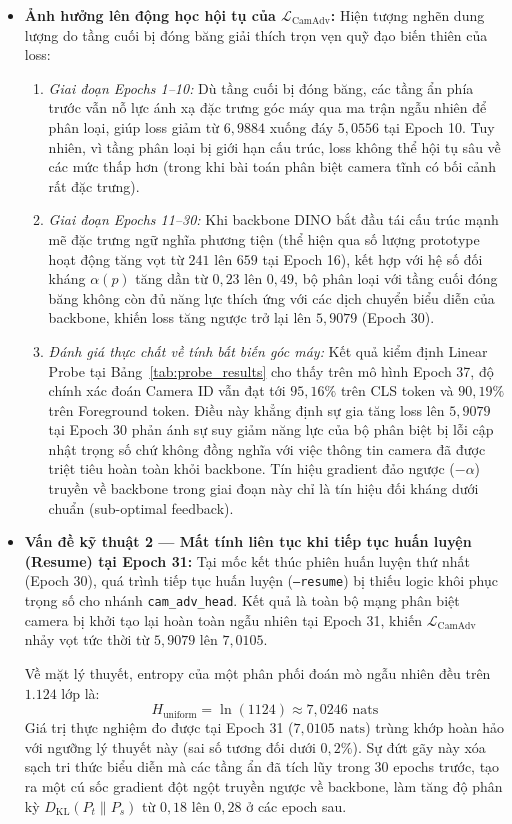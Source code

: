 \documentclass[11pt,a4paper]{article}
\begin{document}
\begin{itemize}
    \item \textbf{Ảnh hưởng lên động học hội tụ của $\mathcal{L}_{\text{CamAdv}}$:}
    Hiện tượng nghẽn dung lượng do tầng cuối bị đóng băng giải thích trọn vẹn quỹ đạo biến thiên của loss:
    \begin{enumerate}
        \item \textit{Giai đoạn Epochs 1--10:} Dù tầng cuối bị đóng băng, các tầng ẩn phía trước vẫn nỗ lực ánh xạ đặc trưng góc máy qua ma trận ngẫu nhiên để phân loại, giúp loss giảm từ $6{,}9884$ xuống đáy $5{,}0556$ tại Epoch 10. Tuy nhiên, vì tầng phân loại bị giới hạn cấu trúc, loss không thể hội tụ sâu về các mức thấp hơn (trong khi bài toán phân biệt camera tĩnh có bối cảnh rất đặc trưng).
        \item \textit{Giai đoạn Epochs 11--30:} Khi backbone DINO bắt đầu tái cấu trúc mạnh mẽ đặc trưng ngữ nghĩa phương tiện (thể hiện qua số lượng prototype hoạt động tăng vọt từ $241$ lên $659$ tại Epoch 16), kết hợp với hệ số đối kháng $\alpha(p)$ tăng dần từ $0{,}23$ lên $0{,}49$, bộ phân loại với tầng cuối đóng băng không còn đủ năng lực thích ứng với các dịch chuyển biểu diễn của backbone, khiến loss tăng ngược trở lại lên $5{,}9079$ (Epoch 30).
        \item \textit{Đánh giá thực chất về tính bất biến góc máy:} Kết quả kiểm định Linear Probe tại Bảng~\ref{tab:probe_results} cho thấy trên mô hình Epoch 37, độ chính xác đoán Camera ID vẫn đạt tới $95{,}16\%$ trên CLS token và $90{,}19\%$ trên Foreground token. Điều này khẳng định sự gia tăng loss lên $5{,}9079$ tại Epoch 30 phản ánh sự suy giảm năng lực của bộ phân biệt bị lỗi cập nhật trọng số chứ không đồng nghĩa với việc thông tin camera đã được triệt tiêu hoàn toàn khỏi backbone. Tín hiệu gradient đảo ngược ($-\alpha$) truyền về backbone trong giai đoạn này chỉ là tín hiệu đối kháng dưới chuẩn (sub-optimal feedback).
    \end{enumerate}

    \item \textbf{Vấn đề kỹ thuật 2 --- Mất tính liên tục khi tiếp tục huấn luyện (Resume) tại Epoch 31:}
    Tại mốc kết thúc phiên huấn luyện thứ nhất (Epoch 30), quá trình tiếp tục huấn luyện (\texttt{--resume}) bị thiếu logic khôi phục trọng số cho nhánh \texttt{cam\_adv\_head}. Kết quả là toàn bộ mạng phân biệt camera bị khởi tạo lại hoàn toàn ngẫu nhiên tại Epoch 31, khiến $\mathcal{L}_{\text{CamAdv}}$ nhảy vọt tức thời từ $5{,}9079$ lên $7{,}0105$.
    
    Về mặt lý thuyết, entropy của một phân phối đoán mò ngẫu nhiên đều trên $1.124$ lớp là:
    \begin{equation}
        H_{\text{uniform}} = \ln(1124) \approx 7{,}0246\text{ nats}
    \end{equation}
    Giá trị thực nghiệm đo được tại Epoch 31 ($7{,}0105\text{ nats}$) trùng khớp hoàn hảo với ngưỡng lý thuyết này (sai số tương đối dưới $0{,}2\%$). Sự đứt gãy này xóa sạch tri thức biểu diễn mà các tầng ẩn đã tích lũy trong 30 epochs trước, tạo ra một cú sốc gradient đột ngột truyền ngược về backbone, làm tăng độ phân kỳ $D_{\text{KL}}(P_t \parallel P_s)$ từ $0{,}18$ lên $0{,}28$ ở các epoch sau.
\end{itemize}
\end{document}
